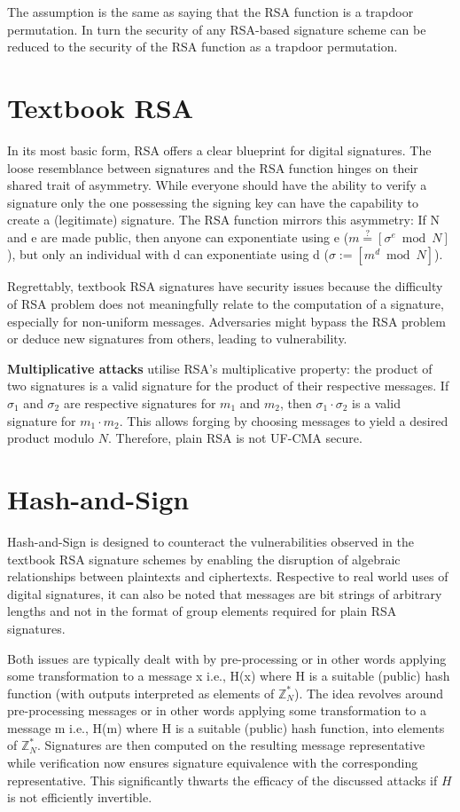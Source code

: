 \documentclass[]{final_report}
\theoremstyle{definition}
\begin{document}
The assumption is the same as saying that the RSA function is a trapdoor permutation. In turn the security of any RSA-based signature scheme can be reduced to the security of the RSA function as a trapdoor permutation.


\section{Textbook RSA}
In its most basic form, RSA offers a clear blueprint for digital signatures. The loose resemblance between signatures and the RSA function hinges on their shared trait of asymmetry. While everyone should have the ability to verify a signature only the one possessing the signing key can have the capability to create a (legitimate) signature. The RSA function mirrors this asymmetry: If N and e are made public, then anyone can exponentiate using e ($m \stackrel{?}{=} [\sigma^e \bmod N]$), but only an individual with d can exponentiate using d ($\sigma := [m^d \bmod N]$). 

Regrettably, textbook RSA signatures have security issues because the difficulty of RSA problem does not meaningfully relate to the computation of a signature, especially for non-uniform messages. Adversaries might bypass the RSA problem or deduce new signatures from others, leading to vulnerability.

\textbf{Multiplicative attacks} utilise RSA's multiplicative property: the product of two signatures is a valid signature for the product of their respective messages. If \( \sigma_{1} \) and \( \sigma_{2} \) are respective signatures for \( m_{1} \) and \( m_{2} \), then \( \sigma_{1} \cdot \sigma_{2} \) is a valid signature for \( m_{1} \cdot m_{2} \). This allows forging by choosing messages to yield a desired product modulo \( N \). Therefore, plain RSA is not UF-CMA secure.

\section{Hash-and-Sign}
\label{def:hashed rsa}
Hash-and-Sign is designed to counteract the vulnerabilities observed in the textbook RSA signature schemes by enabling the disruption of algebraic relationships between plaintexts and ciphertexts. Respective to real world uses of digital signatures, it can also be noted that messages are bit strings of arbitrary lengths and not in the format of group elements required for plain RSA signatures.

Both issues are typically dealt with by pre-processing or in other words applying some transformation to a message x i.e., H(x) where H is a suitable (public) hash function (with outputs interpreted as elements of $\mathbb{Z}^*_{N}$).
The idea revolves around pre-processing messages or in other words applying some transformation to a message m i.e., H(m) where H is a suitable (public) hash function, into elements of \( \mathbb{Z}^*_{N} \). Signatures are then computed on the resulting message representative while verification now ensures signature equivalence with the corresponding representative. This significantly thwarts the efficacy of the discussed attacks if \( H \) is not efficiently invertible.
\end{document}
